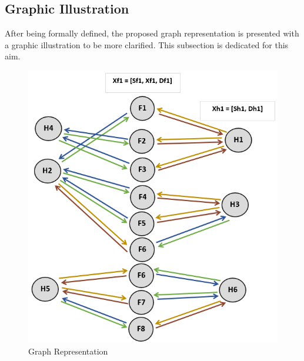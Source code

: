 \subsection{Graphic Illustration}
After being formally defined, the proposed graph representation is presented with a graphic illustration to be more clarified. This subsection is dedicated for this aim. 
\begin{figure}[H]
    \centering
    \includegraphics[scale=0.85]{figures/graph_exp.png}
    \captionsetup{font=large}
    \caption{Graph Representation}
        \label{fig:graph_exp}
\end{figure}

